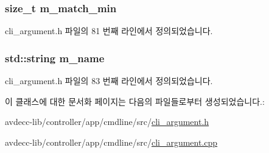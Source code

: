 \subsubsection[{\texorpdfstring{m\+\_\+match\+\_\+min}{m_match_min}}]{\setlength{\rightskip}{0pt plus 5cm}size\+\_\+t m\+\_\+match\+\_\+min\hspace{0.3cm}{\ttfamily [protected]}}\hypertarget{classcli__argument_a9e9208481670105577821d0a1aee5179}{}\label{classcli__argument_a9e9208481670105577821d0a1aee5179}


cli\+\_\+argument.\+h 파일의 81 번째 라인에서 정의되었습니다.

\subsubsection[{\texorpdfstring{m\+\_\+name}{m_name}}]{\setlength{\rightskip}{0pt plus 5cm}std\+::string m\+\_\+name\hspace{0.3cm}{\ttfamily [protected]}}\hypertarget{classcli__argument_adb41893ba19e889e56c559f25fc1a68a}{}\label{classcli__argument_adb41893ba19e889e56c559f25fc1a68a}


cli\+\_\+argument.\+h 파일의 83 번째 라인에서 정의되었습니다.



이 클래스에 대한 문서화 페이지는 다음의 파일들로부터 생성되었습니다.\+:\begin{DoxyCompactItemize}
\item 
avdecc-\/lib/controller/app/cmdline/src/\hyperlink{cli__argument_8h}{cli\+\_\+argument.\+h}\item 
avdecc-\/lib/controller/app/cmdline/src/\hyperlink{cli__argument_8cpp}{cli\+\_\+argument.\+cpp}\end{DoxyCompactItemize}

